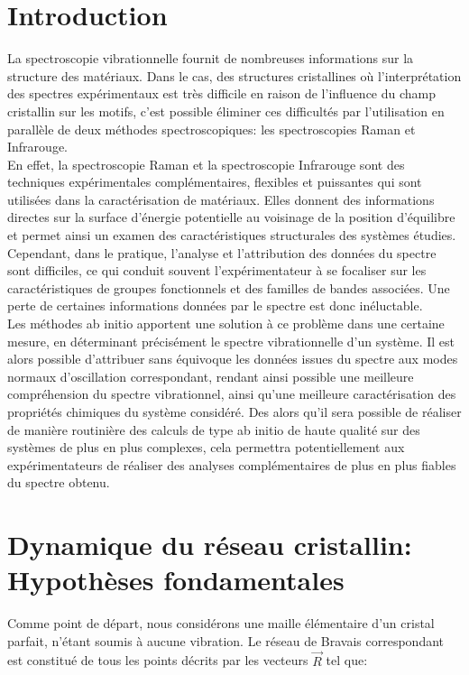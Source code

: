 \documentclass[12pt,a4paper]{book}
\begin{document}
	\section*{Introduction}
	La spectroscopie vibrationnelle fournit de nombreuses informations sur la structure des matériaux. Dans le cas, des structures cristallines où l'interprétation des spectres expérimentaux est très difficile en raison de l'influence du champ cristallin sur les motifs, c'est possible éliminer ces difficultés par l'utilisation en parallèle de deux méthodes spectroscopiques: les spectroscopies Raman et Infrarouge. \\
	
	En effet, la spectroscopie Raman et la spectroscopie Infrarouge sont des techniques expérimentales complémentaires, flexibles et puissantes qui sont utilisées dans la caractérisation de matériaux. Elles donnent des informations directes sur la surface d'énergie potentielle au voisinage de la position d'équilibre et permet ainsi un examen des caractéristiques structurales des systèmes étudies. Cependant, dans le pratique, l'analyse et l'attribution des données du spectre sont difficiles, ce qui conduit souvent l'expérimentateur à se focaliser sur les caractéristiques de groupes fonctionnels et des familles de bandes associées. Une perte de certaines informations données par le spectre est donc inéluctable. \\
		
	Les méthodes ab initio apportent une solution à ce problème dans une certaine mesure, en déterminant précisément le spectre vibrationnelle d'un système. Il est alors possible d'attribuer sans équivoque les données issues du spectre aux modes normaux d'oscillation correspondant, rendant ainsi possible une meilleure compréhension du spectre vibrationnel, ainsi qu'une meilleure caractérisation des propriétés chimiques du système considéré. Des alors qu'il sera possible de réaliser de manière routinière des calculs de type ab initio de haute qualité sur des systèmes de plus en plus complexes, cela permettra potentiellement aux expérimentateurs de réaliser des analyses complémentaires de plus en plus fiables du spectre obtenu. 
	
		
\section{Dynamique du réseau cristallin: Hypothèses fondamentales}
	
	Comme point de départ, nous considérons une maille élémentaire d'un cristal parfait, n'étant soumis à aucune vibration. Le réseau de Bravais correspondant est constitué de tous les points décrits par les vecteurs $\overrightarrow{R}$ tel que:
	
\end{document}

